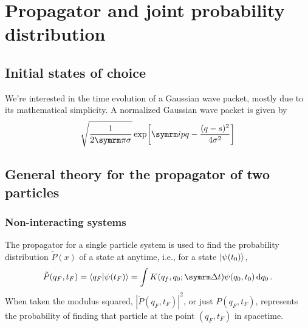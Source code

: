 \chapter{Propagator and joint probability distribution}

\section{Initial states of choice}

We're interested in the time evolution of a Gaussian wave packet, mostly due to its mathematical simplicity. A normalized Gaussian wave packet is given by
\begin{equation}
    \sqrt{\frac{1}{2\cpi\sigma}}\exp[\im p q - \frac{(q - s)^2}{4\sigma^2}]
\end{equation} 

\section{General theory for the propagator of two particles}

\subsection{Non-interacting systems}

The propagator for a single particle system is used to find the probability distribution $\tilde{P}(x)$ of a state at anytime, i.e., for a state $\ket{\psi(t_0)}$,
\begin{equation}
    \tilde{P}(q_F, t_F) = \braket{q_F}{\psi(t_F)} = \int K(q_f, q_0; \Dd{t})\psi(q_0, t_0)\dd{q_0}.
\end{equation}
When taken the modulus squared, $|\tilde{P}(q_F, t_F)|^2$, or just $P(q_F, t_F)$, represents the probability of finding that particle at the point $(q_F, t_F)$ in spacetime.

